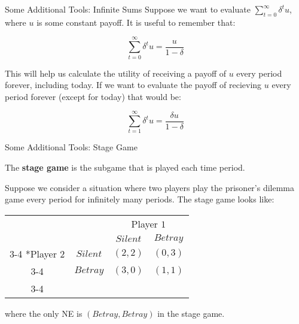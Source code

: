 \documentclass[aspectratio=169]{beamer}
\begin{document}
\begin{frame}{Some Additional Tools: Infinite Sums}
Suppose we want to evaluate $\sum^\infty_{t=0} \delta^t u $, where $u$ is some constant payoff. It is useful to remember that:

\[\sum^\infty_{t=0} \delta^t u = \frac{u}{1-\delta} \]

This will help us calculate the utility of receiving a payoff of $u$ every period forever, including today. If we want to evaluate the payoff of recieving $u$ every period forever (except for today) that would be:

\[\sum^\infty_{t=1} \delta^t u = \frac{\delta u}{1-\delta} \]
    
\end{frame}

\begin{frame}{Some Additional Tools: Stage Game }
    \begin{definition}
    The \textbf{stage game} is the subgame that is played each time period.
    \end{definition}
    
   Suppose we consider a situation where two players play the prisoner's dilemma game every period for infinitely many periods. The stage game looks like:
    \begin{table}
    \setlength{\extrarowheight}{2pt}
    \begin{tabular}{cc|c|c|}
      & \multicolumn{1}{c}{} & \multicolumn{2}{c}{Player $1$}\\
      & \multicolumn{1}{c}{} & \multicolumn{1}{c}{$Silent$}  & \multicolumn{1}{c}{$Betray$} \\\cline{3-4}
      \multirow{2}*{Player $2$}  & $Silent$ & $(2,2)$ & $(0,3)$ \\\cline{3-4}
      & $Betray$ & $(3,0)$ & $(1,1)$ \\\cline{3-4}
    \end{tabular}
  \end{table}
  where the only NE is $(Betray, Betray)$ in the stage game.
\end{frame}
\end{document}
